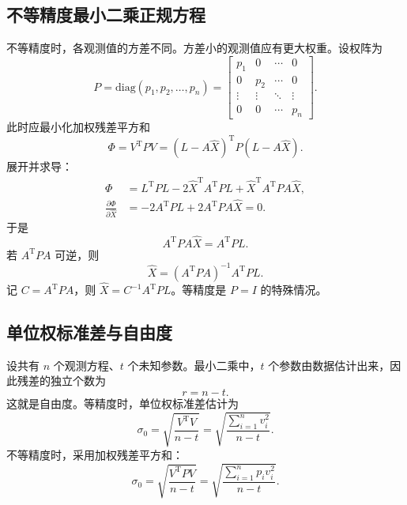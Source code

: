 \documentclass[UTF8,12pt,a4paper]{ctexart}
\newcommand{\T}{\mathrm{T}}
\newcommand{\diag}{\mathrm{diag}}
\begin{document}
\subsection{不等精度最小二乘正规方程}
不等精度时，各观测值的方差不同。方差小的观测值应有更大权重。设权阵为
\begin{equation*}
    P=\diag(p_1,p_2,\ldots,p_n)=
    \begin{bmatrix}
p_1 & 0 & \cdots & 0\\
0 & p_2 & \cdots & 0\\
\vdots & \vdots & \ddots & \vdots\\
0 & 0 & \cdots & p_n
\end{bmatrix}.
\end{equation*}
此时应最小化加权残差平方和
\begin{equation*}
    \Phi=V^\T P V=(L-A\hat{X})^\T P(L-A\hat{X}) .
\end{equation*}
展开并求导：
\begin{equation*}
\begin{aligned}
    \Phi
    &=L^\T P L-2\hat{X}^\T A^\T P L+
      \hat{X}^\T A^\T P A\hat{X},\\
    \frac{\partial\Phi}{\partial\hat{X}}
    &=-2A^\T P L+2A^\T P A\hat{X}=0 .
\end{aligned}
\end{equation*}
于是
\begin{equation*}
    A^\T P A\hat{X}=A^\T P L .
\end{equation*}
若 $A^\T P A$ 可逆，则
\begin{equation*}
    \hat{X}=(A^\T P A)^{-1}A^\T P L .
\end{equation*}
记 $C=A^\T P A$，则 $\hat{X}=C^{-1}A^\T P L$。等精度是 $P=I$ 的特殊情况。

\subsection{单位权标准差与自由度}
设共有 $n$ 个观测方程、$t$ 个未知参数。最小二乘中，$t$ 个参数由数据估计出来，因此残差的独立个数为
\begin{equation*}
    r=n-t .
\end{equation*}
这就是自由度。等精度时，单位权标准差估计为
\begin{equation*}
    \sigma_0=\sqrt{\frac{V^\T V}{n-t}}
    =\sqrt{\frac{\sum_{i=1}^{n}v_i^2}{n-t}} .
\end{equation*}
不等精度时，采用加权残差平方和：
\begin{equation*}
    \sigma_0=\sqrt{\frac{V^\T P V}{n-t}}
    =\sqrt{\frac{\sum_{i=1}^{n}p_i v_i^2}{n-t}} .
\end{equation*}
\end{document}
